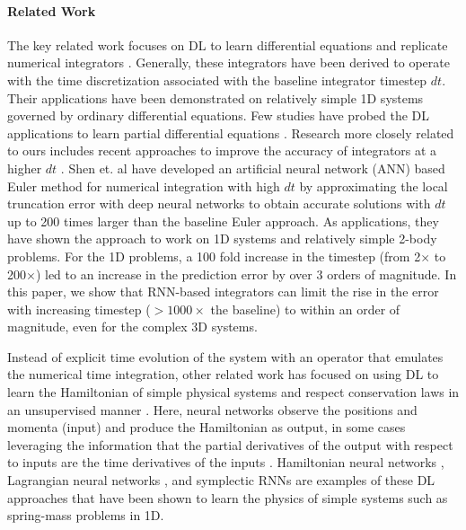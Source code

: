 \documentclass[aps,prl,twocolumn,superscriptaddress,tightenlines,longbibliography, reprint]{revtex4-1}
\begin{document}
\paragraph{Related Work}
The key related work focuses on DL to learn differential equations and replicate numerical integrators \cite{raissi2018hidden, raissi2018multistep, long2017pde, chen2018neural, endo2018multi, breen2019newton, chen2019symplectic, tronarp2020bayesian}. Generally, these integrators have been derived to operate with the time discretization associated with the baseline integrator timestep $dt$. Their applications have been demonstrated on relatively simple 1D systems governed by ordinary differential equations. Few studies have probed the DL applications to learn partial differential equations \cite{long2017pde}.
Research more closely related to ours includes recent approaches to improve the accuracy of integrators at a higher $dt$ \cite{shen2020deep,raissi2018multistep}. 
Shen et. al \cite{shen2020deep} have developed an artificial neural network (ANN) based Euler method for numerical integration with high $dt$ by approximating the local truncation error with deep neural networks to obtain accurate solutions with $dt$ up to 200 times larger than the baseline Euler approach. As applications, they have shown the approach to work on 1D systems and relatively simple 2-body problems. For the 1D problems, a 100 fold increase in the timestep (from 2$\times$ to 200$\times$) led to an increase in the prediction error by over 3 orders of magnitude. %
In this paper, we show that RNN-based integrators can limit the rise in the error with increasing timestep ($>1000\times$ the baseline) to within an order of magnitude, even for the complex 3D systems.

Instead of explicit time evolution of the system with an operator that emulates the numerical time integration, other related work has focused on using DL to learn the Hamiltonian of simple physical systems and respect conservation laws in an unsupervised manner  \cite{greydanus2019hamiltonian,cranmer2020lagrangian,chen2019symplectic,battaglia2016interaction, chang2016compositional, rupp2012fast, chmiela2017machine,sanchez2019hamiltonian, shin2020convergence}.
Here, neural networks observe the positions and momenta (input) and produce the Hamiltonian as output, in some cases leveraging the information that the partial derivatives of the output with respect to inputs are the time derivatives of the inputs \cite{greydanus2019hamiltonian}.
Hamiltonian neural networks \cite{greydanus2019hamiltonian}, Lagrangian neural networks \cite{cranmer2020lagrangian}, and symplectic RNNs \cite{chen2019symplectic} are examples of these DL approaches that have been shown to learn the physics of simple systems such as spring-mass problems in 1D. 
\end{document}
